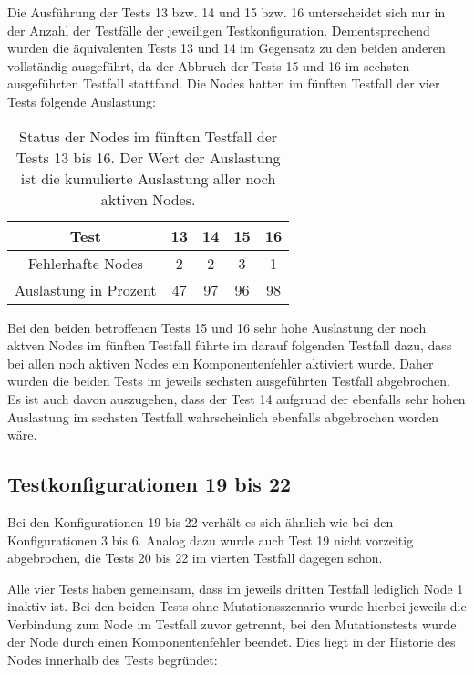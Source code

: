 Die Ausführung der Tests 13 bzw. 14 und 15 bzw. 16 unterscheidet sich nur in der Anzahl der Testfälle der jeweiligen Testkonfiguration.
Dementsprechend wurden die äquivalenten Tests 13 und 14 im Gegensatz zu den beiden anderen vollständig ausgeführt, da der Abbruch der Tests 15 und 16 im sechsten ausgeführten Testfall stattfand.
Die Nodes hatten im fünften Testfall der vier Tests folgende Auslastung:

\begin{table}[h]
    \begin{tabular}{c|cccc}
    	        Test          & 13 & 14 & 15 & 16 \\ \hline
    	  Fehlerhafte Nodes   & 2  & 2  & 3  & 1  \\
    	Auslastung in Prozent & 47 & 97 & 96 & 98
    \end{tabular}
    \caption[Status der Nodes im fünften Testfall der Tests 13 bis 16]
        {Status der Nodes im fünften Testfall der Tests 13 bis 16.
        Der Wert der Auslastung ist die kumulierte Auslastung aller noch aktiven Nodes.}
    \label{tab:loadTests1316}
\end{table}

Bei den beiden betroffenen Tests 15 und 16 sehr hohe Auslastung der noch aktven Nodes im fünften Testfall führte im darauf folgenden Testfall dazu, dass bei allen noch aktiven Nodes ein Komponentenfehler aktiviert wurde.
Daher wurden die beiden Tests im jeweils sechsten ausgeführten Testfall abgebrochen.
Es ist auch davon auszugehen, dass der Test 14 aufgrund der ebenfalls sehr hohen Auslastung im sechsten Testfall wahrscheinlich ebenfalls abgebrochen worden wäre.

\subsection{Testkonfigurationen 19 bis 22}
\label{subsec:noReconf1922}

Bei den Konfigurationen 19 bis 22 verhält es sich ähnlich wie bei den Konfigurationen 3 bis 6.
Analog dazu wurde auch Test 19 nicht vorzeitig abgebrochen, die Tests 20 bis 22 im vierten Testfall dagegen schon.

Alle vier Tests haben gemeinsam, dass im jeweils dritten Testfall lediglich Node 1 inaktiv ist.
Bei den beiden Tests ohne Mutationsszenario wurde hierbei jeweils die Verbindung zum Node im Testfall zuvor getrennt, bei den Mutationstests wurde der Node durch einen Komponentenfehler beendet.
Dies liegt in der Historie des Nodes innerhalb des Tests begründet:

